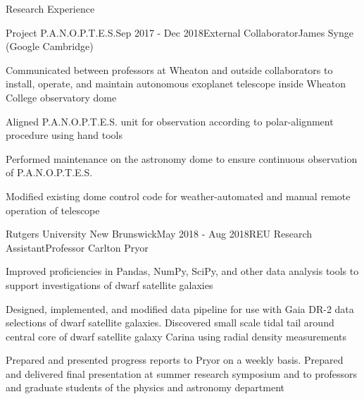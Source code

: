 \documentclass{resume} %
\begin{document}
\begin{rSection}{Research Experience}
\newpage \begin{rSubsection}{Project P.A.N.O.P.T.E.S.}{Sep 2017 - Dec 2018}{External Collaborator}{James Synge (Google Cambridge)}
\item Communicated between professors at Wheaton and outside collaborators to install, operate, and maintain autonomous exoplanet telescope inside Wheaton College observatory dome
\item Aligned P.A.N.O.P.T.E.S. unit for observation according to polar-alignment procedure using hand tools
\item Performed maintenance on the astronomy dome to ensure continuous observation of P.A.N.O.P.T.E.S.
\item Modified existing dome control code for weather-automated and manual remote operation of telescope
\end{rSubsection}

\begin{rSubsection}{Rutgers University New Brunswick}{May 2018 - Aug 2018}{REU Research Assistant}{Professor Carlton Pryor}
\item Improved proficiencies in Pandas, NumPy, SciPy, and other data analysis tools to support investigations of dwarf satellite galaxies
\item Designed, implemented, and modified data pipeline for use with Gaia DR-2 data selections of dwarf satellite galaxies. Discovered small scale tidal tail around central core of dwarf satellite galaxy Carina using radial density measurements
\item Prepared and presented progress reports to Pryor on a weekly basis. Prepared and delivered final presentation at summer research symposium and to professors and graduate students of the physics and astronomy department
\end{rSubsection}


\end{rSection}
\end{document}
